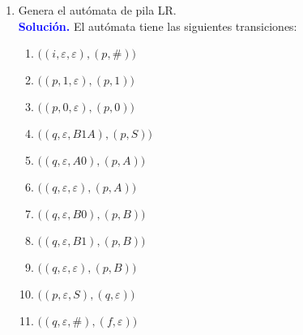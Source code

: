 \documentclass[11pt,fleqn]{article}
\newcommand{\solution}{\textcolor{blue}{\textbf{Solución. }}}
\begin{document}
\begin{enumerate}
\begin{enumerate}
        \item Genera el autómata de pila LR. \\
        \solution El autómata tiene las siguientes transiciones:
        \begin{enumerate}[label=\arabic*.-, leftmargin=15mm]
            \item $\big((i,\varepsilon,\varepsilon),(p,\#)\big)$
            \item $\big((p,1,\varepsilon),(p,1)\big)$
            \item $\big((p,0,\varepsilon),(p,0)\big)$
            \item $\big((q,\varepsilon,B1A),(p,S)\big)$
            \item $\big((q,\varepsilon,A0),(p,A)\big)$
            \item $\big((q,\varepsilon,\varepsilon),(p,A)\big)$
            \item $\big((q,\varepsilon,B0),(p,B)\big)$
            \item $\big((q,\varepsilon,B1),(p,B)\big)$
            \item $\big((q,\varepsilon,\varepsilon),(p,B)\big)$
            \item $\big((p,\varepsilon,S),(q,\varepsilon)\big)$
            \item $\big((q,\varepsilon,\#),(f,\varepsilon)\big)$
        \end{enumerate}
        

\end{enumerate}
\end{enumerate}
\end{document}
